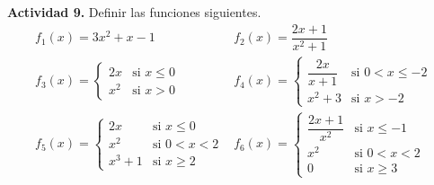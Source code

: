 \documentclass[11pt]{article}
\begin{document}
    \textbf{Actividad 9.} Definir las funciones siguientes.
\[\begin{array}{ll}
    f_1(x)=3x^2+x-1 & f_2(x)=\dfrac{2x+1}{x^2+1}\\
    f_3(x)=\begin{cases}
        2x & \text{si }x\le0\\
        x^2 & \text{si }x>0
    \end{cases} & f_4(x)=\begin{cases}
    \dfrac{2x}{x+1} & \text{si }0<x\le-2\\
    x^2+3 & \text{si }x>-2
    \end{cases}\\
    f_5(x)=\begin{cases}
        2x & \text{si }x\le0\\
        x^2 & \text{si }0<x<2\\
        x^3+1 & \text{si }x\ge 2
    \end{cases} & f_6(x)=\begin{cases}
    \dfrac{2x+1}{x^2} & \text{si }x\le-1\\
    x^2 & \text{si }0<x<2\\
    0 & \text{si }x\ge 3
    \end{cases}
\end{array} \]
\end{document}
